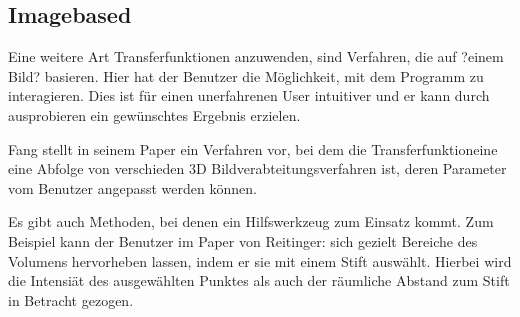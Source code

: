\subsection{Imagebased}
Eine weitere Art Transferfunktionen anzuwenden, sind Verfahren, die auf ?einem Bild? basieren. Hier hat der Benutzer die Möglichkeit, mit dem Programm zu interagieren. Dies ist für einen unerfahrenen User intuitiver und er kann durch ausprobieren ein gewünschtes Ergebnis erzielen.

Fang stellt in seinem Paper \cite{fang1998image} ein Verfahren vor, bei dem die  Transferfunktioneine eine Abfolge von verschieden 3D Bildverabteitungsverfahren ist, deren Parameter vom Benutzer angepasst werden können.

Es gibt auch Methoden, bei denen ein Hilfswerkzeug zum Einsatz kommt. Zum Beispiel kann der Benutzer im Paper von Reitinger: \cite{reitinger2004user} sich gezielt Bereiche des Volumens hervorheben lassen, indem er sie mit einem Stift auswählt. Hierbei wird die Intensiät des ausgewählten Punktes als auch der räumliche Abstand zum Stift in Betracht gezogen.


